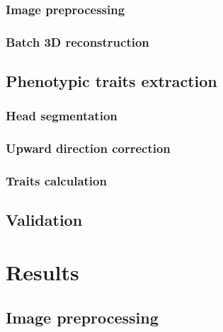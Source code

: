
\subsubsection{Image preprocessing}



\subsubsection{Batch 3D reconstruction}



\subsection{Phenotypic traits extraction}


\subsubsection{Head segmentation}

\subsubsection{Upward direction correction}

\subsubsection{Traits calculation}


\subsection{Validation}




\section{Results}

\subsection{Image preprocessing}


